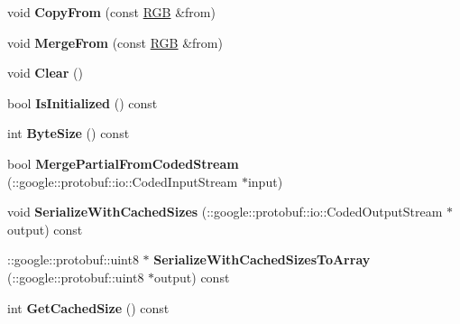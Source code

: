 \begin{DoxyCompactItemize}
\item 
void {\bfseries Copy\+From} (const \hyperlink{classvss__state_1_1RGB}{R\+GB} \&from)\hypertarget{classvss__state_1_1RGB_af67ab2848e2357d23f411c0df8bce782}{}\label{classvss__state_1_1RGB_af67ab2848e2357d23f411c0df8bce782}

\item 
void {\bfseries Merge\+From} (const \hyperlink{classvss__state_1_1RGB}{R\+GB} \&from)\hypertarget{classvss__state_1_1RGB_a168e56eb490d40877481d8a709ae8322}{}\label{classvss__state_1_1RGB_a168e56eb490d40877481d8a709ae8322}

\item 
void {\bfseries Clear} ()\hypertarget{classvss__state_1_1RGB_ad0c9a1848a43f2d89ebaa33d51ac6634}{}\label{classvss__state_1_1RGB_ad0c9a1848a43f2d89ebaa33d51ac6634}

\item 
bool {\bfseries Is\+Initialized} () const \hypertarget{classvss__state_1_1RGB_a0d2e0b5f89279b7553ef83d702f0bab8}{}\label{classvss__state_1_1RGB_a0d2e0b5f89279b7553ef83d702f0bab8}

\item 
int {\bfseries Byte\+Size} () const \hypertarget{classvss__state_1_1RGB_a2cd250a169ec6f47428b72537d384bcd}{}\label{classvss__state_1_1RGB_a2cd250a169ec6f47428b72537d384bcd}

\item 
bool {\bfseries Merge\+Partial\+From\+Coded\+Stream} (\+::google\+::protobuf\+::io\+::\+Coded\+Input\+Stream $\ast$input)\hypertarget{classvss__state_1_1RGB_a2e6177a7e8c631c1f62a2d986fdfc452}{}\label{classvss__state_1_1RGB_a2e6177a7e8c631c1f62a2d986fdfc452}

\item 
void {\bfseries Serialize\+With\+Cached\+Sizes} (\+::google\+::protobuf\+::io\+::\+Coded\+Output\+Stream $\ast$output) const \hypertarget{classvss__state_1_1RGB_ab16a3fd0ce7788dd974d078e445e7849}{}\label{classvss__state_1_1RGB_ab16a3fd0ce7788dd974d078e445e7849}

\item 
\+::google\+::protobuf\+::uint8 $\ast$ {\bfseries Serialize\+With\+Cached\+Sizes\+To\+Array} (\+::google\+::protobuf\+::uint8 $\ast$output) const \hypertarget{classvss__state_1_1RGB_a800b57f1540a265138517e52196cc70b}{}\label{classvss__state_1_1RGB_a800b57f1540a265138517e52196cc70b}

\item 
int {\bfseries Get\+Cached\+Size} () const \hypertarget{classvss__state_1_1RGB_a40f2c075e63a05d37dd4023cd25c61e6}{}\label{classvss__state_1_1RGB_a40f2c075e63a05d37dd4023cd25c61e6}


\end{DoxyCompactItemize}
